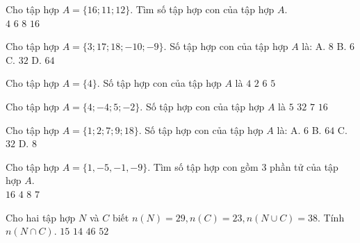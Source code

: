 \begin{ex}
 Cho tập hợp $A=\{{16; 11; 12}\}$. Tìm số tập hợp con của tập hợp ${A}$.\\ 
\choice
{ ${4}$ }
   { ${6}$ }
     { \True ${8}$ }
    { ${16}$ }
\loigiai{ 
  
 }\end{ex}

\begin{ex}Cho tập hợp $A=\{{3; 17; 18; -10; -9}\}$. Số tập hợp con của tập hợp $A$ là:
\choice
{A. ${8}$}
   {B. ${6}$}
     {\True C. ${32}$}
    {D. ${64}$}
\end{ex}

\begin{ex}Cho tập hợp $A=\{{4}\}$. Số tập hợp con của tập hợp ${A}$ là
\choice
{${4}$}
   {\True ${2}$}
     {${6}$}
    {${5}$}
\end{ex}

\begin{ex}Cho tập hợp $A=\{{4; -4; 5; -2}\}$. Số tập hợp con của tập hợp ${A}$ là
\choice
{${5}$}
   {${32}$}
     {${7}$}
    {\True ${16}$}
\end{ex}

\begin{ex}Cho tập hợp $A=\{{1; 2; 7; 9; 18}\}$. Số tập hợp con của tập hợp $A$ là:
\choice
{A. ${6}$}
   {B. ${64}$}
     {\True C. ${32}$}
    {D. ${8}$}
\end{ex}

\begin{ex}
 Cho tập hợp $A=\{{1, -5, -1, -9}\}$. Tìm số tập hợp con gồm 3 phần tử của tập hợp ${A}$. \\ 
\choice
{ ${16}$ }
   { \True ${4}$ }
     { ${8}$ }
    { ${7}$ }
\loigiai{ 
  
 }\end{ex}

\begin{ex}
 Cho hai tập hợp ${N}$ và ${C}$ biết $n(N)=29,n(C)=23, n(N\cup C)=38$. Tính $n(N\cap C)$. 
\choice
{ ${15}$ }
   { \True ${14}$ }
     { ${46}$ }
    { ${52}$ }
\end{ex}

